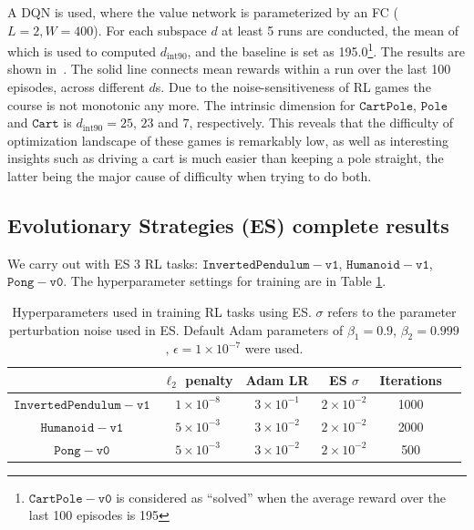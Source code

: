 \documentclass{article} %
\newcommand{\dintn}{d_{\mathrm{int90}}}
\begin{document}
A DQN is used, where the value network is parameterized by an FC ($L=2, W=400$). For each subspace $d$ at least 5 runs are conducted, the mean of which is used to computed $\dintn$, and the baseline is set as 195.0\footnote{$\mathtt{CartPole\!-\!v0}$ is considered as ``solved'' when the average reward over the last 100 episodes is 195}. The results are shown in~. The solid line connects mean rewards within a run over the last 100 episodes, across different $d$s. Due to the noise-sensitiveness of RL games the course is not monotonic any more. The intrinsic dimension for $\mathtt{CartPole}$, $\mathtt{Pole}$ and $\mathtt{Cart}$ is  $\dintn = 25$, $23$ and $7$, respectively. This reveals that the difficulty of optimization landscape of these games is remarkably low, as well as interesting insights such as driving a cart is much easier than keeping a pole straight, the latter being the major cause of difficulty when trying to do both.



\subsection{Evolutionary Strategies (ES) complete results}
We carry out with ES 3 RL tasks: $\mathtt{InvertedPendulum\!-\!v1}$, $\mathtt{Humanoid\!-\!v1}$, $\mathtt{Pong\!-\!v0}$. The hyperparameter settings for training are in Table \ref{tab:rl-hyperparams}.

\begin{table}[h]
\centering
\begin{tabular}{c|ccccc}
         & $\ell_2$ penalty & Adam LR & ES $\sigma$ & Iterations \\
\hline
$\mathtt{InvertedPendulum\!-\!v1}$ & $1 \times 10^{-8}$ & $3 \times 10^{-1}$ & $2 \times 10^{-2}$ & 1000 \\
 $\mathtt{Humanoid\!-\!v1}$  & $5 \times 10^{-3}$ & $3 \times 10^{-2}$ & $2 \times 10^{-2}$ & 2000 \\
$\mathtt{Pong\!-\!v0}$ & $5 \times 10^{-3}$ & $3 \times 10^{-2}$ & $2 \times 10^{-2}$ & 500 
\end{tabular}
\caption{Hyperparameters used in training RL tasks using ES. $\sigma$ refers to the parameter perturbation noise used in ES. Default Adam parameters of $\beta_1=0.9$, $\beta_2=0.999$, $\epsilon=1 \times 10^{-7}$ were used.}
\label{tab:rl-hyperparams}
\end{table}
\end{document}
